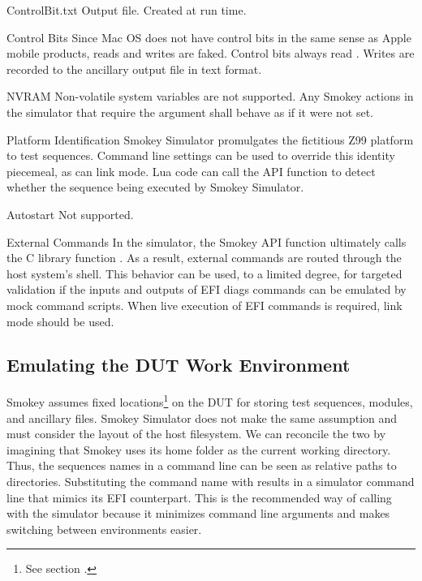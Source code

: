\begin{Descriptive}
\begin{Descriptive}
		\item[ControlBit.txt] Output file.  Created at run time.

	\end{Descriptive}

	\item[Control Bits] Since Mac OS does not have control bits in the same
	sense as Apple mobile products, reads and writes are faked.  Control
	bits always read .  Writes are recorded to the
	ancillary output file  in text format.

	\item[NVRAM] Non-volatile system variables are not supported.  Any
	Smokey actions in the simulator that require the 
	argument shall behave as if it were not set.

	\item[Platform Identification] Smokey Simulator promulgates the
	fictitious Z99 platform to test sequences.  Command line settings can
	be used to override this identity piecemeal, as can link mode.  Lua
	code can call the  API function
	to detect whether the sequence being executed by Smokey Simulator.

	\item[Autostart] Not supported.

	\item[External Commands] In the simulator, the Smokey API function
	 ultimately calls the C library function .  As
	a result, external commands are routed through the host system's shell.
	This behavior can be used, to a limited degree, for targeted validation
	if the inputs and outputs of EFI diags commands can be emulated by mock
	command scripts.  When live execution of EFI commands is required, link
	mode should be used.

\end{Descriptive}

\subsection{Emulating the DUT Work Environment}

Smokey assumes fixed locations\footnote{See section .}
on the DUT for storing test sequences, modules, and ancillary files.  Smokey
Simulator does not make the same assumption and must consider the layout of the
host filesystem.  We can reconcile the two by imagining that Smokey uses its
home folder as the current working directory.  Thus, the sequences names in a
 command line can be seen as relative paths to directories.
Substituting the  command name with 
results in a simulator command line that mimics its EFI counterpart.  This is
the recommended way of calling with the simulator because it minimizes command
line arguments and makes switching between environments easier.

